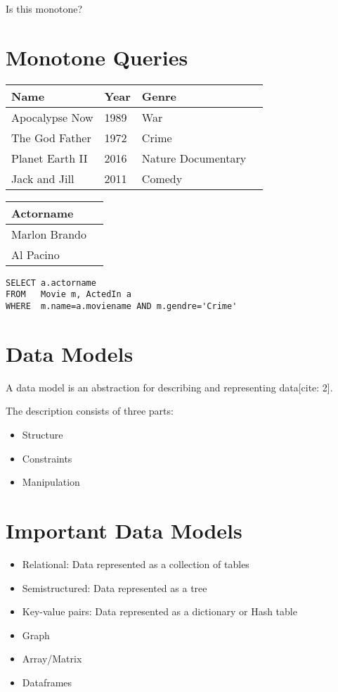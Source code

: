\documentclass{article}
\begin{document}
Is this monotone?

\section*{Monotone Queries}

\begin{tabular}{llll}
\hline
Name & Year & Genre &  \\
\hline
Apocalypse Now & 1989 & War &  \\
The God Father & 1972 & Crime &  \\
Planet Earth II & 2016 & Nature Documentary &  \\
Jack and Jill & 2011 & Comedy &  \\
\hline
\end{tabular}

\begin{tabular}{ll}
\hline
Actorname &  \\
\hline
Marlon Brando &  \\
Al Pacino &  \\
\hline
\end{tabular}

\begin{verbatim}
SELECT a.actorname
FROM   Movie m, ActedIn a
WHERE  m.name=a.moviename AND m.gendre='Crime'
\end{verbatim}

\section*{Data Models}

A data model is an abstraction for describing and representing data[cite: 2].

The description consists of three parts:

\begin{itemize}
    \item Structure
    \item Constraints
    \item Manipulation
\end{itemize}

\section*{Important Data Models}

\begin{itemize}
    \item Relational: Data represented as a collection of tables
    \item Semistructured: Data represented as a tree
    \item Key-value pairs: Data represented as a dictionary or Hash table
    \item Graph
    \item Array/Matrix
    \item Dataframes
\end{itemize}
\end{document}
